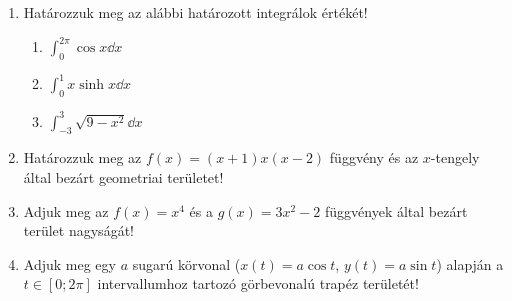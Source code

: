 \documentclass[a4paper, 12pt]{scrartcl}
\begin{document}
\begin{enumerate}
  \item Határozzuk meg az alábbi határozott integrálok értékét!
        \begin{enumerate}
          \item $\displaystyle
                  \int_0^{2\pi} \cos x \dd x
                $

          \item $\displaystyle
                  \int_0^1 x \sinh x \dd x
                $

          \item $\displaystyle
                  \int_{-3}^3 \sqrt{9 - x^2} \dd x
                $
        \end{enumerate}

  \item Határozzuk meg az $f(x) = (x + 1) x  (x - 2)$ függvény és az $x$-tengely
        által bezárt geometriai területet!

  \item Adjuk meg az $f(x) = x^4$ és a $g(x) = 3x^2 - 2$ függvények által bezárt
        terület nagyságát!

  \item Adjuk meg egy $a$ sugarú körvonal ($x(t) = a \cos t$, $y(t) = a \sin t$)
        alapján a $t \in [0; 2\pi]$ intervallumhoz tartozó görbevonalú trapéz
        területét!

\end{enumerate}

\end{document}
